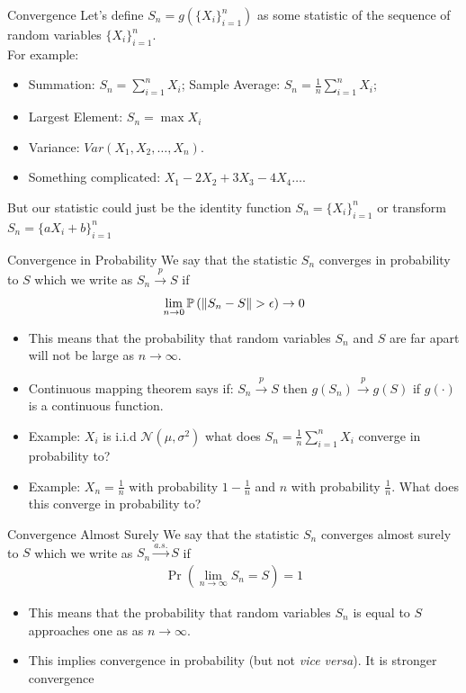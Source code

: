 \begin{frame}{Convergence}
Let's define $S_n = g( \{X_i\}_{i=1}^n)$ as some \alert{statistic} of the sequence of random variables $\{X_i\}_{i=1}^n$.\\
 For example:
\begin{itemize}
	\item Summation: $S_n = \sum_{i=1}^n X_i$; Sample Average: $S_n = \frac{1}{n}\sum_{i=1}^n X_i$;
	\item Largest Element: $S_n = \max  X_i$
	\item Variance: $Var(X_1,X_2,\ldots,X_n)$.
	\item Something complicated: $X_1 - 2 X_2 + 3 X_3 - 4 X_4 \ldots$.
\end{itemize}
But our statistic could just be the identity function $S_n = \{X_i\}_{i=1}^n$ or transform $S_n = \{a X_i +b\}_{i=1}^n$ 
\end{frame}



\begin{frame}{Convergence in Probability}
We say that the statistic $S_n$ \alert{converges in probability} to $S$ which we write as $S_n \overset{p}{\to} S$ if
\begin{align*}
\lim_{n \rightarrow 0} \mathbb{P} \left( \lVert S_n - S\rVert > \epsilon \right) \rightarrow 0
\end{align*}
\begin{itemize}
	\item This means that the \alert{probability} that random variables $S_n$ and $S$ are far apart will not be large as $n\rightarrow \infty$.
	\item Continuous mapping theorem says if: $S_n \overset{p}{\to} S$ then $g(S_n) \overset{p}{\to} g(S)$ if $g(\cdot)$ is a continuous function.
	\item Example: $X_i$ is i.i.d $\mathcal{N}(\mu,\sigma^2)$ what does $S_n = \frac{1}{n} \sum_{i=1}^n X_i$ converge in probability to?
	\item Example: $X_n = \frac{1}{n}$ with probability $1-\frac{1}{n}$ and $n$ with probability $\frac{1}{n}$. What does this converge in probability to?
\end{itemize}
\end{frame}

\begin{frame}{Convergence Almost Surely}
We say that the statistic $S_n$ \alert{converges almost surely} to $S$ which we write as $S_n \overset{a.s.}{\to} S$ if
\begin{align*}
\Pr \left( \lim_{n\rightarrow \infty} S_n = S \right)=1
\end{align*}
\begin{itemize}
	\item This means that the \alert{probability} that random variables $S_n$ is equal to $S$ approaches one as as $n\rightarrow \infty$.
	\item This implies \alert{convergence in probability} (but not \textit{vice versa}). It is \alert{stronger convergence}
\end{itemize}
\end{frame}


